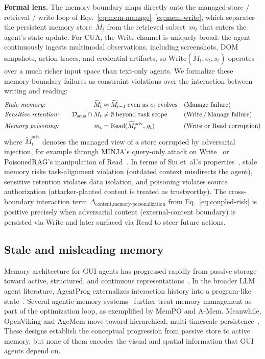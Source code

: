 \noindent\textbf{Formal lens.}
The memory boundary maps directly onto the managed-store / retrieval / write loop of Eqs.~\ref{eq:mem-manage}--\ref{eq:mem-write}, which separates the persistent memory store~$M_t$ from the retrieved subset~$m_t$ that enters the agent's state update. For CUA, the Write channel is uniquely broad: the agent continuously ingests multimodal observations, including screenshots, DOM snapshots, action traces, and credential artifacts, so $\mathrm{Write}(\widetilde{M}_t, o_t, s_t)$ operates over a much richer input space than text-only agents. We formalize these memory-boundary failures as constraint violations over the interaction between writing and reading:
\begin{align}
  &\textit{Stale memory:}\quad & \widetilde{M}_t &\approx \widetilde{M}_{t-1} \;\text{even as } e_t \text{ evolves} & &\text{(Manage failure)} \label{eq:stale} \\
  &\textit{Sensitive retention:}\quad & \mathcal{D}_{\mathrm{sens}} \cap M_t &\neq \emptyset \;\text{beyond task scope} & &\text{(Write\,/\,Manage failure)} \label{eq:retention} \\
  &\textit{Memory poisoning:}\quad & m_t &= \mathrm{Read}(\widetilde{M}_t^{\mathrm{adv}},\, q_t) & &\text{(Write or Read corruption)} \label{eq:poison}
\end{align}
where $\widetilde{M}_t^{\mathrm{adv}}$ denotes the managed view of a store corrupted by adversarial injection, for example through MINJA's query-only attack on Write~\cite{minja2025} or PoisonedRAG's manipulation of Read~\cite{poisonedrag2025}. In terms of Siu et~al.'s properties~\cite{siu2026formalizing}, stale memory risks task-alignment violation (outdated context misdirects the agent), sensitive retention violates data isolation, and poisoning violates source authorization (attacker-planted content is treated as trustworthy). The cross-boundary interaction term $\Delta_{\text{content},\text{memory-personalization}}$ from Eq.~\ref{eq:coupled-risk} is positive precisely when adversarial content (external-content boundary) is persisted via Write and later surfaced via Read to steer future actions.

\subsection{Stale and misleading memory}

Memory architecture for GUI agents has progressed rapidly from passive storage toward active, structured, and continuous representations~\cite{jiang2026anatomy, hu2025memory}. In the broader LLM agent literature, AgentProg externalizes interaction history into a program-like state~\cite{agentprog2025}. Several agentic memory systems~\cite{mempo2026,amem2025,jiang2026magma,li2026hippocampus,nan2025nemori} further treat memory management as part of the optimization loop, as exemplified by MemPO and A-Mem. Meanwhile, OpenViking and AgeMem move toward hierarchical, multi-timescale persistence~\cite{openviking2025,agemem2026}. These designs establish the conceptual progression from passive store to active memory, but none of them encodes the visual and spatial information that GUI agents depend on.

